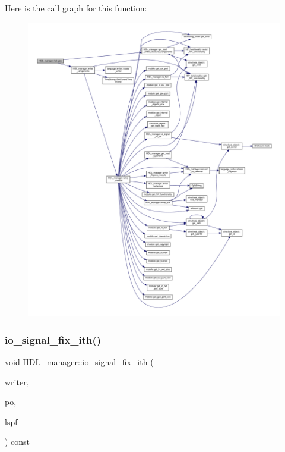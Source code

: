 Here is the call graph for this function\+:
\nopagebreak
\begin{figure}[H]
\begin{center}
\leavevmode
\includegraphics[width=350pt]{d7/d32/classHDL__manager_a0884dfde508d0a59bc176d65b51fc5b7_cgraph}
\end{center}
\end{figure}
\mbox{\label{classHDL__manager_a61d257b049c62e280a5867a06f4f4e2c}} 
\subsubsection{\texorpdfstring{io\+\_\+signal\+\_\+fix\+\_\+ith()}{io\_signal\_fix\_ith()}}
{\footnotesize\ttfamily void H\+D\+L\+\_\+manager\+::io\+\_\+signal\+\_\+fix\+\_\+ith (\begin{DoxyParamCaption}\item[{const \hyperlink{language__writer_8hpp_ab5bb59a651cbff3f3c83b0f51c0b0b71}{language\+\_\+writer\+Ref}}]{writer,  }\item[{const \hyperlink{structural__objects_8hpp_a8ea5f8cc50ab8f4c31e2751074ff60b2}{structural\+\_\+object\+Ref}}]{po,  }\item[{bool \&}]{lspf }\end{DoxyParamCaption}) const\hspace{0.3cm}{\ttfamily [private]}}



